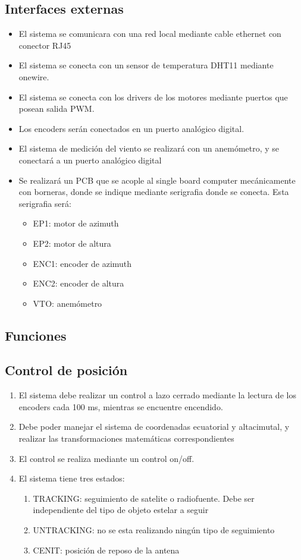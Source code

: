\documentclass[12pt,a4paper, twosite]{article}
\begin{document}
	
	\subsection{Interfaces externas}
	\label{sec:orgfd5391f}
	\begin{itemize}
		\item El sistema se comunicara con una red local mediante cable ethernet con conector RJ45
		\item El sistema se conecta con un sensor de temperatura DHT11 mediante onewire. 
		\item El sistema se conecta con los drivers de los motores mediante puertos que posean salida PWM. 
		\item Los encoders serán conectados en un puerto analógico digital. 
		\item El sistema de medición del viento se realizará con un anemómetro, y se conectará a un puerto analógico digital
		\item Se realizará un PCB que se acople al single board computer mecánicamente con borneras, donde se indique mediante serigrafia donde se conecta. Esta serigrafia será: 
		\begin{itemize}
			\item EP1: motor de azimuth 
			\item EP2: motor de altura
			\item ENC1: encoder de azimuth 
			\item ENC2: encoder de altura 
			\item VTO: anemómetro 
			
		\end{itemize} 
		
	\end{itemize}
	
	\subsection{Funciones}
	\label{sec:org307bb59}
	\subsection{Control de posición}
	\begin{enumerate}
		\item El sistema debe realizar un control a lazo cerrado mediante la lectura de los encoders cada 100 ms, mientras se encuentre encendido.
		\item Debe poder manejar el sistema de coordenadas ecuatorial y altacimutal, y realizar las transformaciones matemáticas correspondientes 
		\item El control se realiza mediante un control on/off. 
		\item El sistema tiene tres estados: 
			\begin{enumerate}
				\item TRACKING: seguimiento de satelite o radiofuente. Debe ser independiente del tipo de objeto estelar a seguir
				\item UNTRACKING: no se esta realizando ningún tipo de seguimiento 
				\item CENIT: posición de reposo de la antena
			\end{enumerate}
	
	\end{enumerate}
\end{document}
